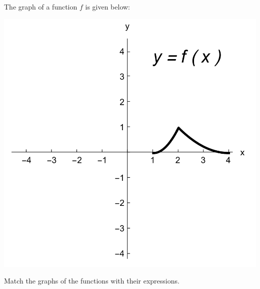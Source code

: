 \documentclass{ximera}
\author{Nala Lakos \and Kyle Parsons}
\begin{document}
\begin{exercise}

The graph of a function $f$ is given below:

\begin{image}
\includegraphics{matchingTransGraph1.png}
\end{image}

Match the graphs of the functions with their expressions.


\end{exercise}
\end{document}
